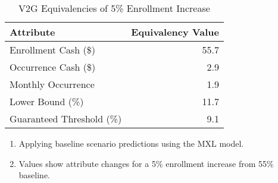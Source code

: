 \begin{table}[H]
\centering
\caption{V2G Equivalencies of 5\% Enrollment Increase}
\setlength{\tabcolsep}{2.5em}

\newsavebox{\myTableBoxB}
\begin{lrbox}{\myTableBoxB}
\begin{tabular}{lr}
\toprule
\textbf{Attribute} & \textbf{Equivalency Value} \\
\midrule
Enrollment Cash (\$) & 55.7 \\
Occurrence Cash (\$) & 2.9 \\
Monthly Occurrence & 1.9 \\
Lower Bound (\%) & 11.7 \\
Guaranteed Threshold (\%) & 9.1 \\
\bottomrule
\end{tabular}
\end{lrbox}

\usebox{\myTableBoxB}

\vspace{0.5em}
\begin{minipage}{\wd\myTableBoxB}
\footnotesize
\begin{enumerate}[leftmargin=2em]  %
\item Applying baseline scenario predictions using the MXL model.
\item Values show attribute changes for a 5\% enrollment increase from 55\% baseline.
\end{enumerate}
\end{minipage}
\label{table_v2g_equiv}
\end{table}
